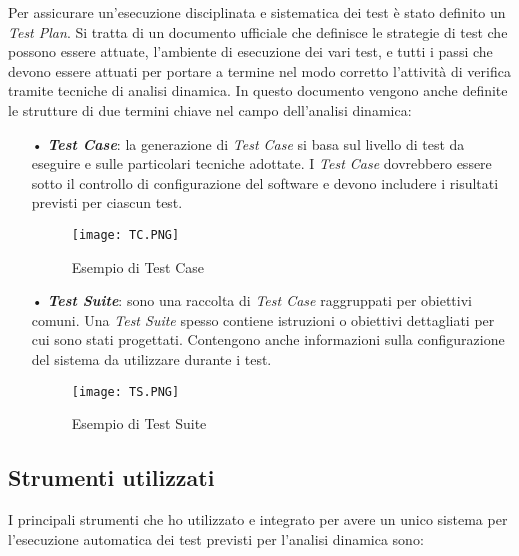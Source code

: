 Per assicurare un'esecuzione disciplinata e sistematica dei test è stato definito un \textit{Test Plan}. Si tratta di un documento ufficiale che definisce le strategie di test che possono essere attuate, l'ambiente di esecuzione dei vari test, e tutti i passi che devono essere attuati per portare a termine nel modo corretto l'attività di verifica tramite tecniche di analisi dinamica. In questo documento vengono anche definite le strutture di due termini chiave nel campo dell'analisi dinamica:
\begin{itemize}
\item[•] \textit{\textbf{Test Case}}: la generazione di \textit{Test Case} si basa sul livello di test da eseguire e sulle particolari tecniche adottate. I \textit{Test Case} dovrebbero essere sotto il controllo di configurazione del software e devono includere i risultati previsti per ciascun test.

\begin{figure}[H]
  \centering
  \texttt{[image: TC.PNG]}
  \caption{Esempio di Test Case}
\end{figure}


\item[•] \textit{\textbf{Test Suite}}: sono una raccolta di \textit{Test Case} raggruppati per obiettivi comuni. Una \textit{Test Suite} spesso contiene istruzioni o obiettivi dettagliati per cui sono stati progettati. Contengono anche informazioni sulla configurazione del sistema da utilizzare durante i test.

\begin{figure}[H]
  \centering
  \texttt{[image: TS.PNG]}
  \caption{Esempio di Test Suite}
\end{figure}
\end{itemize}


\subsection{Strumenti utilizzati}
I principali strumenti che ho utilizzato e integrato per avere un unico sistema per l'esecuzione automatica dei test previsti per l'analisi dinamica sono:

